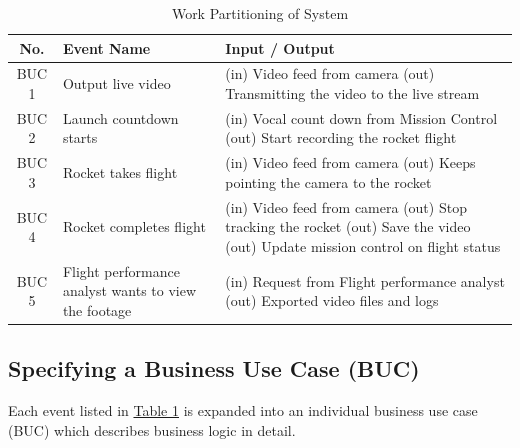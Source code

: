 \documentclass[12pt]{article}
\begin{document}
\begin{table}[H]
  \centering
  \setlength\extrarowheight{5mm}
  \begin{tabularx}{\textwidth}{cp{1.5in}X}
    \toprule \textbf{No.} & \textbf{Event Name}                                  &
    \textbf{Input / Output}                                                        \\
    \midrule
    BUC 1                 & Output live video                                    &
    (in) Video feed from camera \newline
    (out) Transmitting the video to the live stream
    \\
    BUC 2                 & Launch countdown starts                              &
    (in) Vocal count down from Mission Control \newline
    (out) Start recording the rocket flight
    \\
    BUC 3                 & Rocket takes flight                                  &
    (in) Video feed from camera \newline
    (out) Keeps pointing the camera to the rocket
    \\
    BUC 4                 & Rocket completes flight                              &
    (in) Video feed from camera \newline
    (out) Stop tracking the rocket \newline
    (out) Save the video  \newline
    (out) Update mission control on flight status
    \\
    BUC 5                 & Flight performance analyst wants to view the footage &
    (in) Request from Flight performance analyst \newline
    (out) Exported video files and logs
    \\
    \bottomrule
  \end{tabularx}
  \caption{Work Partitioning of System}
  \label{tab:work-part}
\end{table}

\subsection{Specifying a Business Use Case (BUC)}

Each event listed in \hyperref[tab:work-part]{Table 1} is expanded into an
individual business use case (BUC) which describes business logic in detail.

~\\
\end{document}
